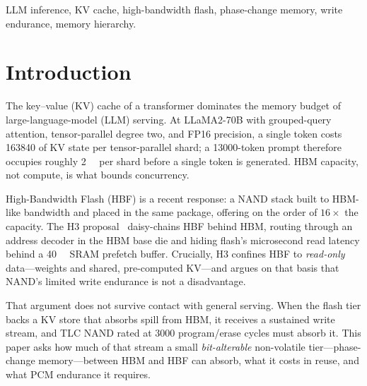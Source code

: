 \documentclass[conference]{IEEEtran}
\begin{document}
\begin{IEEEkeywords}
LLM inference, KV cache, high-bandwidth flash, phase-change memory, write
endurance, memory hierarchy.
\end{IEEEkeywords}

\section{Introduction}
The key--value (KV) cache of a transformer dominates the memory budget of
large-language-model (LLM) serving. At LLaMA2-70B with grouped-query attention,
tensor-parallel degree two, and FP16 precision, a single token costs
\SI{163840}{\byte} of KV state per tensor-parallel shard; a \num{13000}-token
prompt therefore occupies roughly \SI{2}{\gibi\byte} per shard before a single
token is generated. HBM capacity, not
compute, is what bounds concurrency.

High-Bandwidth Flash (HBF) is a recent response: a NAND stack built to HBM-like
bandwidth and placed in the same package, offering on the order of $16\times$
the capacity. The H3 proposal~\cite{h3} daisy-chains HBF behind HBM, routing
through an address decoder in the HBM base die and hiding flash's microsecond
read latency behind a \SI{40}{\mega\byte} SRAM prefetch buffer. Crucially, H3
confines HBF to \emph{read-only} data---weights and shared, pre-computed KV---and
argues on that basis that NAND's limited write endurance is not a disadvantage.

That argument does not survive contact with general serving. When the flash tier
backs a KV store that absorbs spill from HBM, it receives a sustained write
stream, and TLC NAND rated at \num{3000} program/erase cycles must absorb it.
This paper asks how much of that stream a small \emph{bit-alterable}
non-volatile tier---phase-change memory---between HBM and HBF can absorb, what
it costs in reuse, and what PCM endurance it requires.
\end{document}
